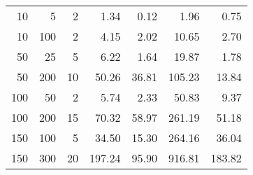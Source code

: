 \begin{tabular}{rrrrrrr}
\toprule
  10 &    5 &   2 &   1.34 &  0.12 &   1.96 &   0.75 \\
  10 &  100 &   2 &   4.15 &  2.02 &  10.65 &   2.70 \\
  50 &   25 &   5 &   6.22 &  1.64 &  19.87 &   1.78 \\
  50 &  200 &  10 &  50.26 & 36.81 & 105.23 &  13.84 \\
 100 &   50 &   2 &   5.74 &  2.33 &  50.83 &   9.37 \\
 100 &  200 &  15 &  70.32 & 58.97 & 261.19 &  51.18 \\
 150 &  100 &   5 &  34.50 & 15.30 & 264.16 &  36.04 \\
 150 &  300 &  20 & 197.24 & 95.90 & 916.81 & 183.82 \\
\bottomrule
\end{tabular}
